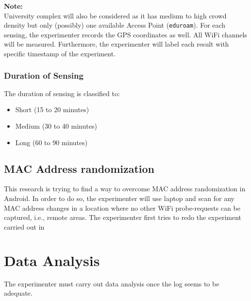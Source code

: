 \documentclass{article}
\begin{document}
\noindent\textbf{Note:}\\
University complex will also be considered as it has medium to high crowd density but only (possibly) one available Access Point (\texttt{eduroam}). For each sensing, the experimenter records the GPS coordinates as well. All WiFi channels will be measured. Furthermore, the experimenter will label each result with specific timestamp of the experiment.

\subsubsection*{Duration of Sensing} %
\label{ssub:duration_of_sensing}
The duration of sensing is classified to:
\begin{itemize}
	\item Short (15 to 20 minutes)
	\item Medium (30 to 40 minutes)
	\item Long (60 to 90 minutes)
\end{itemize}


\subsection{MAC Address randomization} %
\label{sub:mac_address_randomization}
This research is trying to find a way to overcome MAC address randomization in Android. In order to do so, the experimenter will use laptop and scan for any MAC address changes in a location where no other WiFi probe-requests can be captured, i.e., remote areas. The experimenter first tries to redo the experiment carried out in~\cite{thesis060,thesis061,randomization}

\section{Data Analysis} %
\label{sec:data_processing_and_analysis}
The experimenter must carry out data analysis once the log seems to be adequate.
\end{document}
